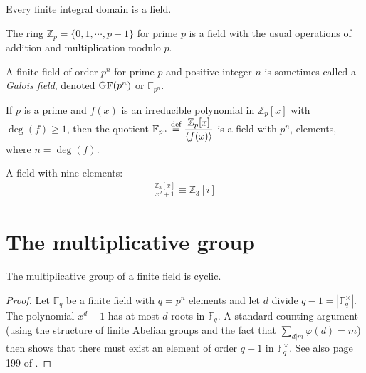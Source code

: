 \documentclass[a4paper, 12pt]{book} %
\begin{document}
\begin{theorem}
    Every finite integral domain is a field.
\end{theorem}


\begin{example}
    The ring $\mathbb{Z}_p = \{\overline{0}, \overline{1}, \cdots, \overline{p-1}\}$ for prime $p$ is a field with the usual operations of addition and multiplication modulo $p$.
\end{example}

A finite field of order $p^n$ for prime $p$ and positive integer $n$ is sometimes called a \emph{Galois field}, denoted $\mathrm{GF}(p^n)$ or $\mathbb{F}_{p^n}$.

\begin{proposition}
    If $p$ is a prime and $f(x)$ is an irreducible polynomial in $\mathbb{Z}_p[x]$ with $\deg(f) \geq 1$, then the quotient $\mathbb{F}_{p^n} \overset{\text{def}}{=} \dfrac{\mathbb{Z}_p[x]}{\langle f(x) \rangle}$ is a field with $p^n$, elements, where $n = \deg(f)$.
\end{proposition}

\begin{example}
    A field with nine elements: 
    \begin{align}
        \frac{\mathbb{Z}_3[x]}{x^2 + 1} \equiv \mathbb{Z}_3[i]
    \end{align}
\end{example}




\section{The multiplicative group}

\begin{proposition}
     The multiplicative group of a finite field is cyclic.
\end{proposition}

\begin{proof}
    Let $\mathbb{F}_q$ be a finite field with $q = p^n$ elements and let $d$ divide $q - 1 = |\mathbb{F}_q^\times|$. The polynomial $x^d - 1$ has at most $d$ roots in $\mathbb{F}_q$. A standard counting argument (using the structure of finite Abelian groups and the fact that $\sum_{d|m} \varphi(d) = m$) then shows that there must exist an element of order $q - 1$ in $\mathbb{F}_q^\times$. See also page 199 of \cite{zheng2022modern}.
\end{proof}
\end{document}
